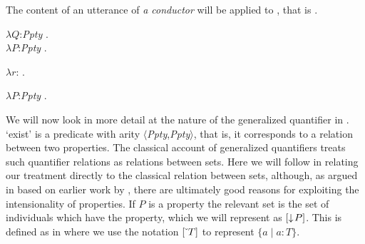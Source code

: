 The content of an utterance of \textit{a conductor}
will be  applied to , that is .
\begin{ex} 
\begin{subex} 
 
\item  $\lambda Q$:\textit{Ppty} . \\
\hspace*{1em} $\lambda P$:\textit{Ppty}
. 
 
\item $\lambda
r$:
.  

\item $\lambda P$:\textit{Ppty}
. 
 
\end{subex} 
\label{ex:a-conductor}   
\end{ex} 

We will now look in more detail at the nature of the generalized
quantifier in .  `exist' is a predicate with arity
$\langle$\textit{Ppty},\textit{Ppty}$\rangle$, that is, it corresponds
to a relation between two properties.  The classical account of
generalized quantifiers \citep[][and much other
literature]{BarwiseCooper1981,PetersWesterstahl2006} treats such
quantifier relations as relations between sets.  Here we will follow
\cite{Cooper2011,Cooper2013} in relating our treatment directly to the
classical relation between sets, although, as argued in
\cite{Cooper2012a} based on earlier work by \cite{KeenanStavi1986}, there are ultimately good reasons for exploiting
the intensionality of properties.   If $P$ is a property the relevant
set is the set of individuals which have the property, which we will
represent as $[\downarrow\!P]$.  This is defined as in \nexteg{} where
we use the notation $[\ \!\check{}\ \!T]$ to represent $\{a\mid a:T\}$.\label{pg:type-extension}


